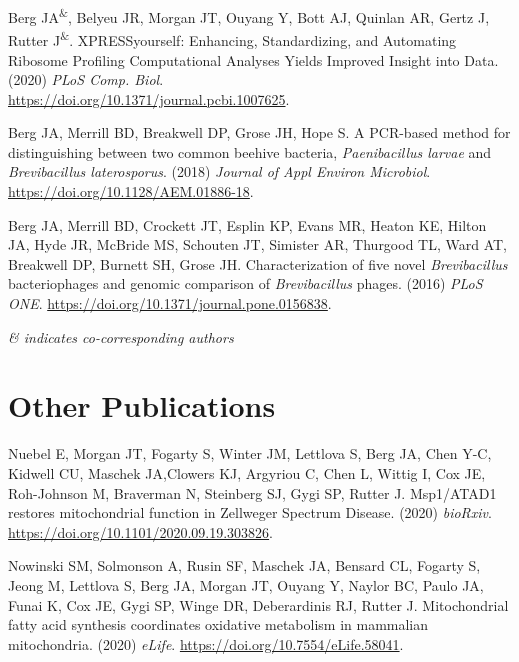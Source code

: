\documentclass[margin,line]{res}
\begin{document}
\begin{resume}
Berg JA\textsuperscript{\&}, Belyeu JR, Morgan JT, Ouyang Y, Bott AJ, Quinlan AR, Gertz J, Rutter J\textsuperscript{\&}. XPRESSyourself: Enhancing, Standardizing, and Automating Ribosome Profiling Computational Analyses Yields Improved Insight into Data. (2020) \textit{PLoS Comp. Biol}. \\ \href{https://journals.plos.org/ploscompbiol/article?id=10.1371/journal.pcbi.1007625}{https://doi.org/10.1371/journal.pcbi.1007625}.

Berg JA, Merrill BD, Breakwell DP, Grose JH, Hope S. A PCR-based method for distinguishing between two common beehive bacteria, \textit{Paenibacillus larvae} and \textit{Brevibacillus laterosporus}. (2018) \textit{Journal of Appl Environ Microbiol}. \href{https://aem.asm.org/content/84/22/e01886-18}{https://doi.org/10.1128/AEM.01886-18}.

Berg JA, Merrill BD, Crockett JT, Esplin KP, Evans MR, Heaton KE, Hilton JA, Hyde JR, McBride MS, Schouten JT, Simister AR, Thurgood TL, Ward AT, Breakwell DP, Burnett SH, Grose JH. Characterization of five novel \textit{Brevibacillus} bacteriophages and genomic comparison of \textit{Brevibacillus} phages. (2016) \textit{PLoS ONE}. \href{https://journals.plos.org/plosone/article?id=10.1371/journal.pone.0156838}{https://doi.org/10.1371/journal.pone.0156838}.

\textit{\small{\& indicates co-corresponding authors}}


\section{\sc Other Publications}
%
%

Nuebel E, Morgan JT, Fogarty S, Winter JM, Lettlova S, Berg JA, Chen Y-C, Kidwell CU, Maschek JA,Clowers KJ, Argyriou C, Chen L, Wittig I, Cox JE, Roh-Johnson M, Braverman N, Steinberg SJ, Gygi SP, Rutter J. Msp1/ATAD1 restores mitochondrial function in Zellweger Spectrum Disease. (2020) \textit{bioRxiv}. \href{https://www.biorxiv.org/content/10.1101/2020.09.19.303826v1}{https://doi.org/10.1101/2020.09.19.303826}.

Nowinski SM, Solmonson A, Rusin SF, Maschek JA, Bensard CL, Fogarty S, Jeong M, Lettlova S, Berg JA, Morgan JT, Ouyang Y, Naylor BC, Paulo JA, Funai K, Cox JE, Gygi SP, Winge DR, Deberardinis RJ, Rutter J. Mitochondrial fatty acid synthesis coordinates oxidative metabolism in mammalian mitochondria. (2020) \textit{eLife}. \href{https://elifesciences.org/articles/58041}{https://doi.org/10.7554/eLife.58041}.


\end{resume}
\end{document}
